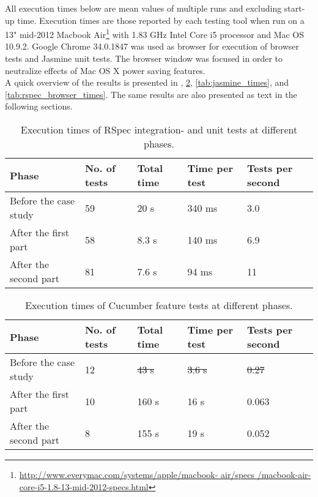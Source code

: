 \label{sec:results_time}

All execution times below are mean values of multiple runs and excluding
start-up time. Execution times are those reported by each testing tool
when run on a 13" mid-2012 Macbook
Air\footnote{\url{http://www.everymac.com/systems/apple/macbook-
air/specs /macbook-air-core-i5-1.8-13-mid-2012-specs.html}} with 1.83
GHz Intel Core i5 processor and Mac OS 10.9.2. Google Chrome 34.0.1847
was used as browser for execution of browser tests and Jasmine unit
tests. The browser window was focused in order to neutralize effects of
Mac OS X power saving features.\\

A quick overview of the results is presented in ,
\ref{tab:cucumber_times}, \ref{tab:jasmine_times}, and
\ref{tab:rspec_browser_times}. The same results are also presented as
text in the following sections.\\

\begin{table}[t]
    \centering
    \begin{tabular}{l l l l l}
        Phase & No. of tests & Total time & Time per test & Tests per second\\
        \hline
        Before the case study & 59 & 20 s & 340 ms & 3.0 \\
        After the first part  & 58 & 8.3 s  & 140 ms & 6.9 \\
        After the second part & 81 & 7.6 s  & 94 ms & 11\\
    \end{tabular}
    \caption{ Execution times of RSpec integration- and unit tests at different phases. }
    \label{tab:unit_times}
\end{table}

\begin{table}[t]
    \centering
    \begin{tabular}{l l l l l}
        Phase & No. of tests & Total time & Time per test & Tests per second \\
        \hline
        Before the case study & 12 & \sout{43 s} & \sout{3.6 s} & \sout{0.27}\\
        After the first part  & 10 & 160 s & 16 s & 0.063\\
        After the second part & 8 &  155 s & 19 s & 0.052\\
    \end{tabular}
    \caption{ Execution times of Cucumber feature tests at different phases. }
    \label{tab:cucumber_times}
\end{table}

